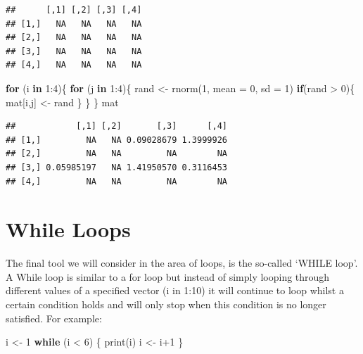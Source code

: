 \documentclass[
]{book}
\newenvironment{Shaded}{\begin{snugshade}}{\end{snugshade}}
\newcommand{\AttributeTok}[1]{\textcolor[rgb]{0.77,0.63,0.00}{#1}}
\newcommand{\ControlFlowTok}[1]{\textcolor[rgb]{0.13,0.29,0.53}{\textbf{#1}}}
\newcommand{\DecValTok}[1]{\textcolor[rgb]{0.00,0.00,0.81}{#1}}
\newcommand{\FunctionTok}[1]{\textcolor[rgb]{0.00,0.00,0.00}{#1}}
\newcommand{\NormalTok}[1]{#1}
\newcommand{\OtherTok}[1]{\textcolor[rgb]{0.56,0.35,0.01}{#1}}
\newcommand{\SpecialCharTok}[1]{\textcolor[rgb]{0.00,0.00,0.00}{#1}}
\theoremstyle{definition}
\theoremstyle{definition}
\theoremstyle{definition}
\theoremstyle{definition}
\theoremstyle{remark}
\begin{document}
\begin{verbatim}
##      [,1] [,2] [,3] [,4]
## [1,]   NA   NA   NA   NA
## [2,]   NA   NA   NA   NA
## [3,]   NA   NA   NA   NA
## [4,]   NA   NA   NA   NA
\end{verbatim}

\begin{Shaded}
\begin{Highlighting}[]
\ControlFlowTok{for}\NormalTok{ (i }\ControlFlowTok{in} \DecValTok{1}\SpecialCharTok{:}\DecValTok{4}\NormalTok{)\{}
  \ControlFlowTok{for}\NormalTok{ (j }\ControlFlowTok{in} \DecValTok{1}\SpecialCharTok{:}\DecValTok{4}\NormalTok{)\{}
\NormalTok{  rand }\OtherTok{\textless{}{-}} \FunctionTok{rnorm}\NormalTok{(}\DecValTok{1}\NormalTok{, }\AttributeTok{mean =} \DecValTok{0}\NormalTok{, }\AttributeTok{sd =} \DecValTok{1}\NormalTok{)}
  \ControlFlowTok{if}\NormalTok{(rand }\SpecialCharTok{\textgreater{}} \DecValTok{0}\NormalTok{)\{}
\NormalTok{    mat[i,j] }\OtherTok{\textless{}{-}}\NormalTok{ rand}
\NormalTok{  \}}
\NormalTok{  \}}
\NormalTok{\}}
\NormalTok{mat}
\end{Highlighting}
\end{Shaded}

\begin{verbatim}
##            [,1] [,2]       [,3]      [,4]
## [1,]         NA   NA 0.09028679 1.3999926
## [2,]         NA   NA         NA        NA
## [3,] 0.05985197   NA 1.41950570 0.3116453
## [4,]         NA   NA         NA        NA
\end{verbatim}

\hypertarget{while-loops}{%
\section{While Loops}\label{while-loops}}

The final tool we will consider in the area of loops, is the so-called `WHILE loop'. A While loop is similar to a for loop but instead of simply looping through different values of a specified vector (i in 1:10) it will continue to loop whilst a certain condition holds and will only stop when this condition is no longer satisfied. For example:

\begin{Shaded}
\begin{Highlighting}[]
\NormalTok{i }\OtherTok{\textless{}{-}} \DecValTok{1}
\ControlFlowTok{while}\NormalTok{ (i }\SpecialCharTok{\textless{}} \DecValTok{6}\NormalTok{) \{}
  \FunctionTok{print}\NormalTok{(i)}
\NormalTok{  i }\OtherTok{\textless{}{-}}\NormalTok{ i}\SpecialCharTok{+}\DecValTok{1}
\NormalTok{\}}
\end{Highlighting}
\end{Shaded}
\end{document}
